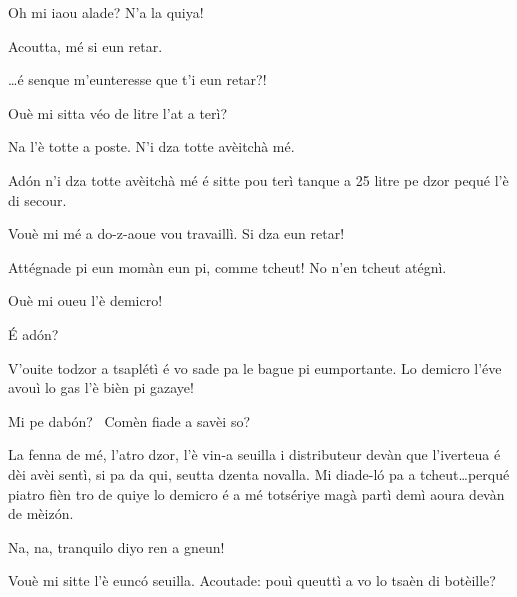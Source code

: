 \begin{drama}

\Pierluigispeaks{} Oh mi iaou alade? N'a la quiya!
 
\Lucianospeaks Acoutta, mé si eun retar.

\Pierluigispeaks \ldots é senque m'eunteresse que t'i eun retar?!


\Lucianospeaks Ouè mi sitta véo de litre l'at a terì?


\Prosperospeaks{} Na l'è totte a poste. N'i dza totte avèitchà mé. 


\Prosperospeaks Ad\'on n'i dza totte avèitchà mé é sitte pou terì tanque a 25 litre pe dzor pequé l'è di secour.

\Lucianospeaks Vouè mi mé a do-z-aoue vou travaillì. Si dza eun retar! 

\Prosperospeaks Attégnade pi eun momàn eun pi, comme tcheut! No n'en tcheut atégnì.

\Lucianospeaks Ouè mi oueu l'è demicro!

\Prosperospeaks \'E ad\'on?

\Lucianospeaks V'ouite todzor a tsaplétì é vo sade pa le bague pi eumportante. Lo demicro l'éve avouì lo gas l'è bièn pi gazaye!

\Prosperospeaks Mi pe dab\'on? \confuso\ Comèn fiade a savèi so?

\Lucianospeaks La fenna de mé, l'atro dzor, l'è vin-a seuilla i distributeur devàn que l’iverteua é dèi avèi sentì, si pa da qui, seutta dzenta novalla. Mi diade-l\'o pa a tcheut\ldots perqué piatro fièn tro de quiye lo demicro é a mé totsériye magà partì demì aoura devàn de mèiz\'on.

\Prosperospeaks Na, na, tranquilo diyo ren a gneun!

\Lucianospeaks {} Vouè mi sitte l'è eunc\'o seuilla.  Acoutade: pouì queuttì a vo lo tsaèn di botèille?


\end{drama}
